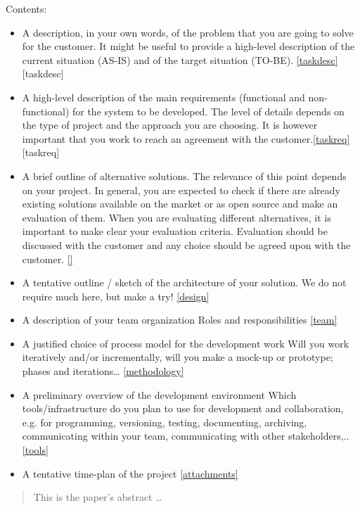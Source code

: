 \documentclass[12pt]{article}
\begin{document}
\begin{should contain}
    Contents:
    \begin{itemize}
    \item A description, in your own words, of the problem that you are going to solve for the customer. It might be useful to provide a high-level description of the current situation (AS-IS) and of the target situation (TO-BE). \ref{taskdesc}[taskdesc]
    \item A high-level description of the main requirements (functional and non-functional) for the system to be developed. The level of details depends on the  type of project and the approach you are choosing. It is however important that you work to reach an agreement with the customer.\ref{taskreq}[taskreq]
    \item A brief outline of alternative solutions. The relevance of this point depends on your project. In general, you are expected to check if there are already existing solutions available on the market or as open source and make an evaluation of them. When you are evaluating different alternatives, it is important to make clear your evaluation criteria. Evaluation should be discussed with the customer and any choice should be agreed upon with the customer. \ref{}
    \item A tentative outline / sketch of the architecture of your solution. 
    We do not require much here, but make a try! \ref{design}
    \item A description of your team organization
    Roles and responsibilities \ref{team}
    \item A justified choice of process model for the development work 
    Will you work iteratively and/or incrementally, will you make a mock-up or prototype; phases and iterations… \ref{methodology}
    \item A preliminary overview of the development environment 
    Which tools/infrastructure do you plan to use for development and collaboration, e.g. for programming, versioning, testing, documenting, archiving, communicating within your team, communicating with other stakeholders,.. \ref{tools}
    \item A tentative time-plan of the project \ref{attachments}
    \end{itemize}
\end{should contain}

\newpage
\begin{abstract}\label{abstract}
This is the paper's abstract \ldots
\end{abstract}
\end{document}
